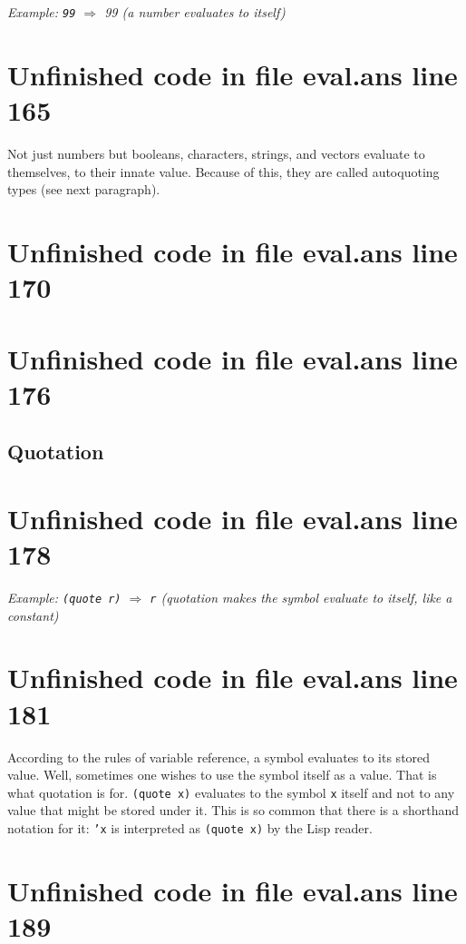 \documentclass[twoside,9pt]{report}
\begin{document}
\emph{Example: \texttt{99} $\Rightarrow$ 99 (a number evaluates to itself)}

\section{Unfinished code in file eval.ans line 165}

Not just numbers but booleans, characters, strings, and vectors evaluate to themselves, to their innate value. Because of this, they are called autoquoting types (see next paragraph).

\section{Unfinished code in file eval.ans line 170}
\section{Unfinished code in file eval.ans line 176}
\subsection{Quotation}
\label{quotation}
\section{Unfinished code in file eval.ans line 178}


\emph{Example: \texttt{(quote r)} $\Rightarrow$ \texttt{r} (quotation makes the symbol evaluate to itself, like a constant)}

\section{Unfinished code in file eval.ans line 181}

According to the rules of variable reference, a symbol evaluates to its stored value. Well, sometimes one wishes to use the symbol itself as a value. That is what quotation is for. \texttt{(quote x)} evaluates to the symbol \texttt{x} itself and not to any value that might be stored under it. This is so common that there is a shorthand notation for it: \texttt{'x} is interpreted as \texttt{(quote x)} by the Lisp reader.

\section{Unfinished code in file eval.ans line 189}
\end{document}
